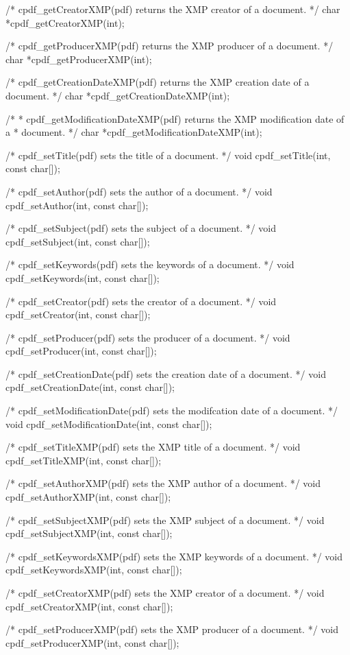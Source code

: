 /* cpdf_getCreatorXMP(pdf) returns the XMP creator of a document. */
char *cpdf_getCreatorXMP(int);

/* cpdf_getProducerXMP(pdf) returns the XMP producer of a document. */
char *cpdf_getProducerXMP(int);

/* cpdf_getCreationDateXMP(pdf) returns the XMP creation date of a document. */
char *cpdf_getCreationDateXMP(int);

/*
 * cpdf_getModificationDateXMP(pdf) returns the XMP modification date of a
 * document.
 */
char *cpdf_getModificationDateXMP(int);

/* cpdf_setTitle(pdf) sets the title of a document. */
void cpdf_setTitle(int, const char[]);

/* cpdf_setAuthor(pdf) sets the author of a document. */
void cpdf_setAuthor(int, const char[]);

/* cpdf_setSubject(pdf) sets the subject of a document. */
void cpdf_setSubject(int, const char[]);

/* cpdf_setKeywords(pdf) sets the keywords of a document. */
void cpdf_setKeywords(int, const char[]);

/* cpdf_setCreator(pdf) sets the creator of a document. */
void cpdf_setCreator(int, const char[]);

/* cpdf_setProducer(pdf) sets the producer of a document. */
void cpdf_setProducer(int, const char[]);

/* cpdf_setCreationDate(pdf) sets the creation date of a document. */
void cpdf_setCreationDate(int, const char[]);

/* cpdf_setModificationDate(pdf) sets the modifcation date of a document. */
void cpdf_setModificationDate(int, const char[]);

/* cpdf_setTitleXMP(pdf) sets the XMP title of a document. */
void cpdf_setTitleXMP(int, const char[]);

/* cpdf_setAuthorXMP(pdf) sets the XMP author of a document. */
void cpdf_setAuthorXMP(int, const char[]);

/* cpdf_setSubjectXMP(pdf) sets the XMP subject of a document. */
void cpdf_setSubjectXMP(int, const char[]);

/* cpdf_setKeywordsXMP(pdf) sets the XMP keywords of a document. */
void cpdf_setKeywordsXMP(int, const char[]);

/* cpdf_setCreatorXMP(pdf) sets the XMP creator of a document. */
void cpdf_setCreatorXMP(int, const char[]);

/* cpdf_setProducerXMP(pdf) sets the XMP producer of a document. */
void cpdf_setProducerXMP(int, const char[]);

